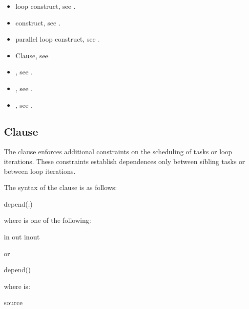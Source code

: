 \crossreferences
\begin{itemize}
\item loop construct, see 
.

\item {} construct, see
.

\item parallel loop construct, see 
.

\item {} Clause, see

\item {}, see
.

\item {}, see
.

\item {}, see
.

\end{itemize}


\subsection{ Clause}
\label{subsec:depend Clause}
\summary
The  clause enforces additional constraints on the scheduling of tasks or loop iterations.  These 
constraints establish dependences only between sibling tasks or between loop iterations. 

\syntax
The syntax of the  clause is as follows:

\begin{boxedcode}
depend(:)
\end{boxedcode}

where  is one of the following:
\begin{indentedcodelist}
in
out
inout
\end{indentedcodelist}

or

\begin{boxedcode}
depend()
\end{boxedcode}

where  is:
\begin{indentedcodelist}
source
\end{indentedcodelist}

